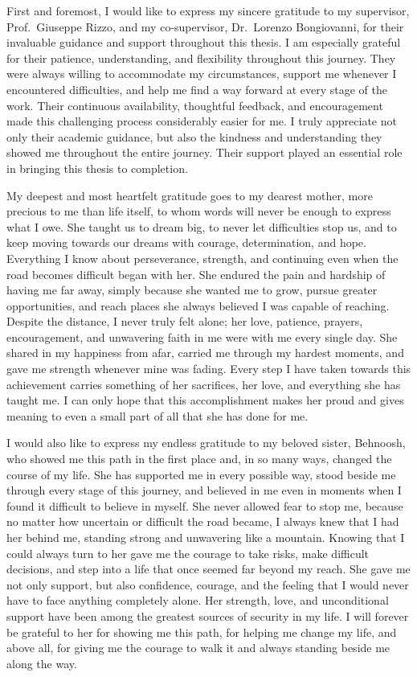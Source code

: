First and foremost, I would like to express my sincere gratitude to my supervisor, Prof.~Giuseppe Rizzo, and my co-supervisor, Dr.~Lorenzo Bongiovanni, for their invaluable guidance and support throughout this thesis. I am especially grateful for their patience, understanding, and flexibility throughout this journey. They were always willing to accommodate my circumstances, support me whenever I encountered difficulties, and help me find a way forward at every stage of the work. Their continuous availability, thoughtful feedback, and encouragement made this challenging process considerably easier for me. I truly appreciate not only their academic guidance, but also the kindness and understanding they showed me throughout the entire journey. Their support played an essential role in bringing this thesis to completion.

My deepest and most heartfelt gratitude goes to my dearest mother, more precious to me than life itself, to whom words will never be enough to express what I owe. She taught us to dream big, to never let difficulties stop us, and to keep moving towards our dreams with courage, determination, and hope. Everything I know about perseverance, strength, and continuing even when the road becomes difficult began with her. She endured the pain and hardship of having me far away, simply because she wanted me to grow, pursue greater opportunities, and reach places she always believed I was capable of reaching. Despite the distance, I never truly felt alone; her love, patience, prayers, encouragement, and unwavering faith in me were with me every single day. She shared in my happiness from afar, carried me through my hardest moments, and gave me strength whenever mine was fading. Every step I have taken towards this achievement carries something of her sacrifices, her love, and everything she has taught me. I can only hope that this accomplishment makes her proud and gives meaning to even a small part of all that she has done for me.

I would also like to express my endless gratitude to my beloved sister, Behnoosh, who showed me this path in the first place and, in so many ways, changed the course of my life. She has supported me in every possible way, stood beside me through every stage of this journey, and believed in me even in moments when I found it difficult to believe in myself. She never allowed fear to stop me, because no matter how uncertain or difficult the road became, I always knew that I had her behind me, standing strong and unwavering like a mountain. Knowing that I could always turn to her gave me the courage to take risks, make difficult decisions, and step into a life that once seemed far beyond my reach. She gave me not only support, but also confidence, courage, and the feeling that I would never have to face anything completely alone. Her strength, love, and unconditional support have been among the greatest sources of security in my life. I will forever be grateful to her for showing me this path, for helping me change my life, and above all, for giving me the courage to walk it and always standing beside me along the way.

